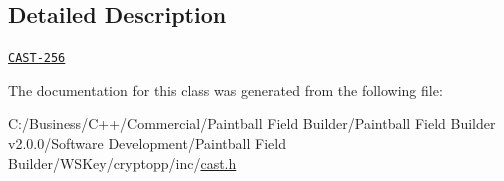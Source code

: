 \subsection{Detailed Description}
\href{http://www.weidai.com/scan-mirror/cs.html#CAST-256}{\tt CAST-\/256} 

The documentation for this class was generated from the following file:\begin{DoxyCompactItemize}
\item 
C:/Business/C++/Commercial/Paintball Field Builder/Paintball Field Builder v2.0.0/Software Development/Paintball Field Builder/WSKey/cryptopp/inc/\hyperlink{cast_8h}{cast.h}\end{DoxyCompactItemize}
